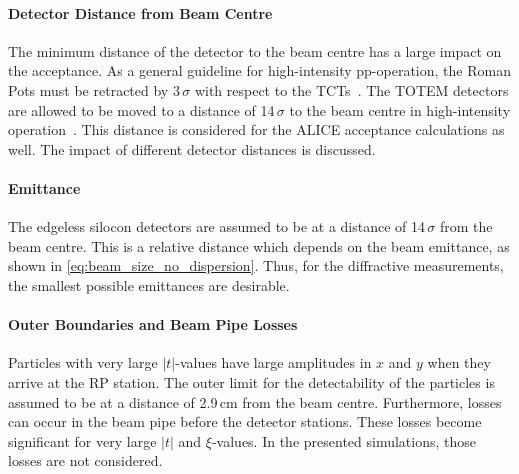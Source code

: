 \paragraph{Detector Distance from Beam Centre}
The minimum distance of the detector to the beam centre has a large impact on the acceptance. As a general guideline for high-intensity pp-operation, the Roman Pots must be retracted by $3\,\sigma$ with respect to the TCTs~\cite{RSchickerPrivate}. The TOTEM detectors are allowed to be moved to a distance of 14$\,\sigma$ to the beam centre in high-intensity operation~\cite{Deile_Private}. This distance is considered for the ALICE acceptance calculations as well. The impact of different detector distances is discussed.
%
\paragraph{Emittance}
The edgeless silocon detectors are assumed to be at a distance of 14$\,\sigma$ from the beam centre. This is a relative distance which depends on the beam emittance, as shown in \eqref{eq:beam_size_no_dispersion}. Thus, for the diffractive measurements, the smallest possible emittances are desirable.  
%
\vspace{-0.5cm}
\paragraph{Outer Boundaries and Beam Pipe Losses}
%
Particles with very large $|t|$-values have large amplitudes in $x$ and $y$ when they arrive at the RP station. The outer limit for the detectability of the particles is assumed to be at a distance of 2.9$\,$cm from the beam centre. Furthermore, losses can occur in the beam pipe before the detector stations. These losses become significant for very large $|t|$ and $\xi$-values. In the presented simulations, those losses are not considered.
